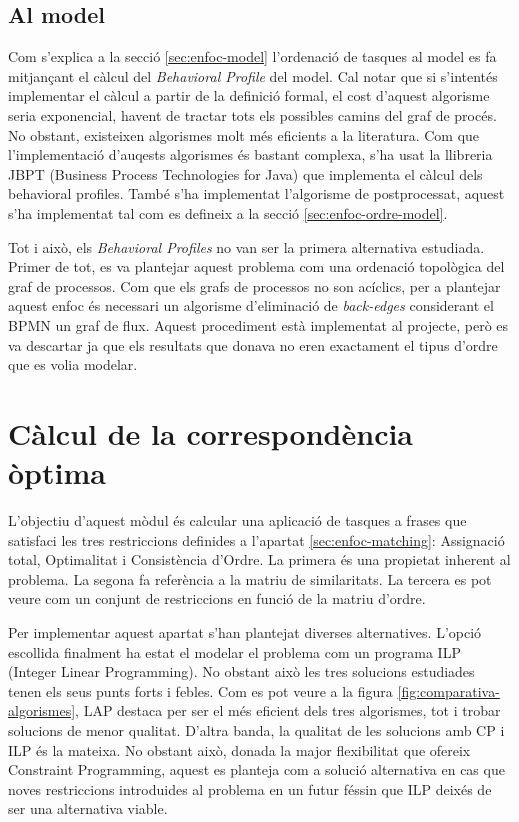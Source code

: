 \subsection{Al model}
\label{sec:implementacio-ordenacio-model}

Com s'explica a la secció \ref{sec:enfoc-model} l'ordenació de tasques al model es fa mitjançant el càlcul del \emph{Behavioral Profile}\cite{behavioral_profiles} del model. Cal notar que si s'intentés implementar el càlcul a partir de la definició formal, el cost d'aquest algorisme seria exponencial, havent de tractar tots els possibles camins del graf de procés. No obstant, existeixen algorismes molt més eficients a la literatura. Com que l'implementació d'auqests algorismes és bastant complexa, s'ha usat la llibreria JBPT (Business Process Technologies for Java) que implementa el càlcul dels behavioral profiles. També s'ha implementat l'algorisme de postprocessat, aquest s'ha implementat tal com es defineix a la secció \ref{sec:enfoc-ordre-model}.

Tot i això, els \emph{Behavioral Profiles} no van ser la primera alternativa estudiada. Primer de tot, es va plantejar aquest problema com una ordenació topològica del graf de processos. Com que els grafs de processos no son acíclics, per a plantejar aquest enfoc és necessari un algorisme d'eliminació de \emph{back-edges} considerant el BPMN un graf de flux\cite{dragon_book}. Aquest procediment està implementat al projecte, però es va descartar ja que els resultats que donava no eren exactament el tipus d'ordre que es volia modelar.

\section{Càlcul de la correspondència òptima}
\label{sec:implementacio-correspondencia}

L'objectiu d'aquest mòdul és calcular una aplicació de tasques a frases que satisfaci les tres restriccions definides a l'apartat \ref{sec:enfoc-matching}: Assignació total, Optimalitat i Consistència d'Ordre. La primera és una propietat inherent al problema. La segona fa referència a la matriu de similaritats. La tercera es pot veure com un conjunt de restriccions en funció de la matriu d'ordre. 

Per implementar aquest apartat s'han plantejat diverses alternatives. L'opció escollida finalment ha estat el modelar el problema com un programa ILP (Integer Linear Programming). No obstant això les tres solucions estudiades tenen els seus punts forts i febles. Com es pot veure a la figura \ref{fig:comparativa-algorismes}, LAP destaca per ser el més eficient dels tres algorismes, tot i trobar solucions de menor qualitat. D'altra banda, la qualitat de les solucions amb CP i ILP és la mateixa. No obstant això, donada la major flexibilitat que ofereix Constraint Programming, aquest es planteja com a solució alternativa en cas que noves restriccions introduides al problema en un futur féssin que ILP deixés de ser una alternativa viable.

